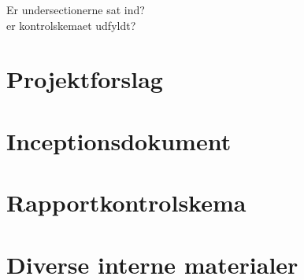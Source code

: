 Er undersectionerne sat ind?\\
er kontrolskemaet udfyldt?
\section{Projektforslag}

\section{Inceptionsdokument}

\section{Rapportkontrolskema}

\section{Diverse interne materialer}
\clearpage
